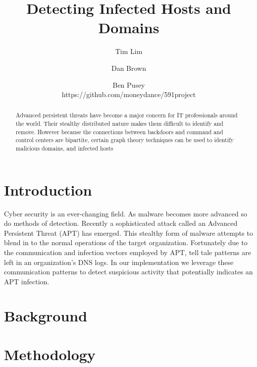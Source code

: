 \documentclass{article} %
\title{Detecting Infected Hosts and Domains}
\author{
Tim  Lim\\
\and
Dan Brown \\
\and
Ben Pusey \\
\AND
https://github.com/moneydance/591project
}
\begin{document}
\maketitle

\begin{abstract}
Advanced persistent threats have become a major concern for IT professionals around the world. Their stealthy distributed nature makes them difficult 
to identify and remove. However because the connections between backdoors and command and control centers are bipartite, certain graph theory
techniques can be used to identify malicious domains, and infected hosts
\end{abstract}

\section{Introduction}
Cyber security is an ever-changing field. As malware becomes more advanced so do methods of detection. Recently a sophisticated attack called an Advanced Persistent Threat (APT) has emerged. This stealthy form of malware attempts to blend in to the normal operations of the target organization. Fortunately due to the communication and infection vectors employed by APT,  tell tale patterns are left in an organization's DNS logs. In our implementation we leverage these communication patterns to detect suspicious activity that potentially indicates an APT infection.





\section{Background}



\section{Methodology}
\label{method}
\end{document}
